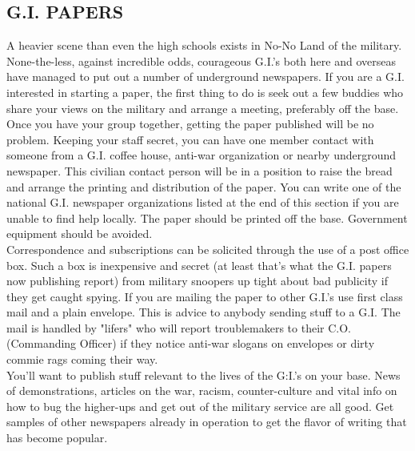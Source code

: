 \documentclass[11pt,twoside,a4paper]{book}
\begin{document}
\subsection{G.I. PAPERS}

A heavier scene than even the high schools exists in No-No Land of the military. None-the-less, against incredible odds, courageous G.I.'s both here and overseas have managed to put out a number of underground newspapers. If you are a G.I. interested in starting a paper, the first thing to do is seek out a few buddies who share your views on the military and arrange a meeting, preferably off the base. Once you have your group together, getting the paper published will be no problem. Keeping your staff secret, you can have one member contact with someone from a G.I. coffee house, anti-war organization or nearby underground newspaper. This civilian contact person will be in a position to raise the bread and arrange the printing and distribution of the paper. You can write one of the national G.I. newspaper organizations listed at the end of this section if you are unable to find help locally. The paper should be printed off the base. Government equipment should be avoided.~\\

Correspondence and subscriptions can be solicited through the use of a post office box. Such a box is inexpensive and secret (at least that's what the G.I. papers now publishing report) from military snoopers up tight about bad publicity if they get caught spying. If you are mailing the paper to other G.I.'s use first class mail and a plain envelope. This is advice to anybody sending stuff to a G.I. The mail is handled by "lifers" who will report troublemakers to their C.O. (Commanding Officer) if they notice anti-war slogans on envelopes or dirty commie rags coming their way.~\\

You'll want to publish stuff relevant to the lives of the G:I.'s on your base. News of demonstrations, articles on the war, racism, counter-culture and vital info on how to bug the higher-ups and get out of the military service are all good. Get samples of other newspapers already in operation to get the flavor of writing that has become popular.~\\
\end{document}

